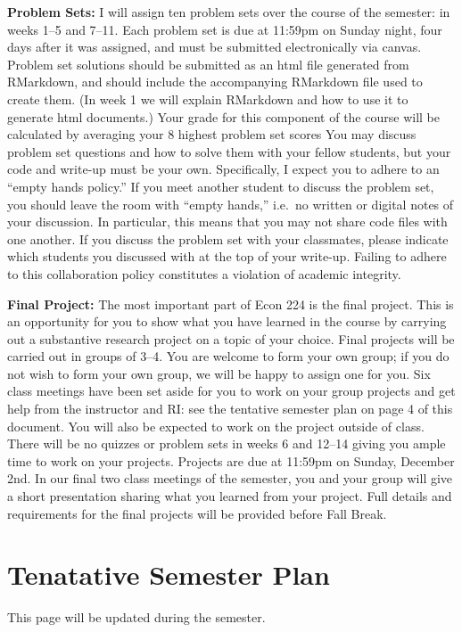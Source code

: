 \documentclass[11pt, letterpaper]{article}
\begin{document}
\medskip


\noindent \textbf{Problem Sets:} 
I will assign ten problem sets over the course of the semester: in weeks 1--5 and 7--11.
Each problem set is due at 11:59pm on Sunday night, four days after it was assigned, and must be submitted electronically via canvas.
Problem set solutions should be submitted as an html file generated from RMarkdown, and should include the accompanying RMarkdown file used to create them.
(In week 1 we will explain RMarkdown and how to use it to generate html documents.)
Your grade for this component of the course will be calculated by averaging your 8 highest problem set scores
You may discuss problem set questions and how to solve them with your fellow students, but your code and write-up must be your own. 
Specifically, I expect you to adhere to an ``empty hands policy.'' 
If you meet another student to discuss the problem set, you should leave the room with ``empty hands,'' i.e.\ no written or digital notes of your discussion.
In particular, this means that you may not share code files with one another.
If you discuss the problem set with your classmates, please indicate which students you discussed with at the top of your write-up.
Failing to adhere to this collaboration policy constitutes a violation of academic integrity.

\medskip

\noindent \textbf{Final Project:}
The most important part of Econ 224 is the final project.
This is an opportunity for you to show what you have learned in the course by carrying out a substantive research project on a topic of your choice.
Final projects will be carried out in groups of 3--4.
You are welcome to form your own group; if you do not wish to form your own group, we will be happy to assign one for you.
Six class meetings have been set aside for you to work on your group projects and get help from the instructor and RI: see the tentative semester plan on page 4 of this document.
You will also be expected to work on the project outside of class.
There will be no quizzes or problem sets in weeks 6 and 12--14 giving you ample time to work on your projects.
Projects are due at 11:59pm on Sunday, December 2nd.
In our final two class meetings of the semester, you and your group will give a short presentation sharing what you learned from your project.
Full details and requirements for the final projects will be provided before Fall Break.

\newpage

\section*{Tenatative Semester Plan} 
This page will be updated during the semester. 
\end{document}
